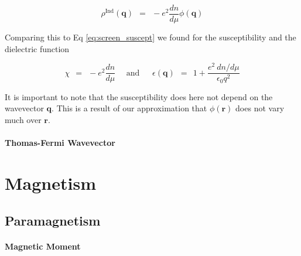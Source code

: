 \documentclass[10pt]{report}
\numberwithin{equation}{chapter}
\newcommand{\refEq}[1]{
  Eq  \ref{#1}
}
\begin{document}
\begin{equation}
  \rho^\text{Ind}(\mathbf{q}) ~~=~~ -e^2 \frac{dn}{d \mu} \phi(\mathbf{q})
\end{equation}

Comparing this to \refEq{eq:screen_suscept} we found for the susceptibility and the dielectric function

\begin{equation}
  \chi ~~=~~ -e^2 \frac{dn}{d \mu} ~~~~~~\text{and}~~~~~~~ 
  \epsilon(\mathbf{q}) ~~=~~ 1 + \frac{e^2\ dn/d\mu}{\epsilon_0 q^2}
\end{equation}

It is important to note that the susceptibility does here not depend on the wavevector $\mathbf{q}$. This is a result of our approximation that $\phi(\mathbf{r})$ does not vary much over $\mathbf{r}$.


\subsubsection{Thomas-Fermi Wavevector}










\chapter{Magnetism}

\section{Paramagnetism}

\subsubsection{Magnetic Moment}
\end{document}
